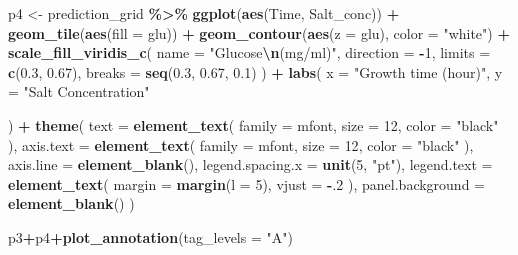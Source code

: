 \documentclass[
  12pt,
]{article}
\newenvironment{Shaded}{\begin{snugshade}}{\end{snugshade}}
\newcommand{\AttributeTok}[1]{\textcolor[rgb]{0.13,0.29,0.53}{#1}}
\newcommand{\DecValTok}[1]{\textcolor[rgb]{0.00,0.00,0.81}{#1}}
\newcommand{\FloatTok}[1]{\textcolor[rgb]{0.00,0.00,0.81}{#1}}
\newcommand{\FunctionTok}[1]{\textcolor[rgb]{0.13,0.29,0.53}{\textbf{#1}}}
\newcommand{\NormalTok}[1]{#1}
\newcommand{\OtherTok}[1]{\textcolor[rgb]{0.56,0.35,0.01}{#1}}
\newcommand{\SpecialCharTok}[1]{\textcolor[rgb]{0.81,0.36,0.00}{\textbf{#1}}}
\newcommand{\StringTok}[1]{\textcolor[rgb]{0.31,0.60,0.02}{#1}}
\begin{document}
\begin{Shaded}
\begin{Highlighting}[]
\NormalTok{p4 }\OtherTok{\textless{}{-}}\NormalTok{ prediction\_grid }\SpecialCharTok{\%\textgreater{}\%}
  \FunctionTok{ggplot}\NormalTok{(}\FunctionTok{aes}\NormalTok{(Time, Salt\_conc)) }\SpecialCharTok{+}
  \FunctionTok{geom\_tile}\NormalTok{(}\FunctionTok{aes}\NormalTok{(}\AttributeTok{fill =}\NormalTok{ glu)) }\SpecialCharTok{+}
  \FunctionTok{geom\_contour}\NormalTok{(}\FunctionTok{aes}\NormalTok{(}\AttributeTok{z =}\NormalTok{ glu), }\AttributeTok{color =} \StringTok{"white"}\NormalTok{) }\SpecialCharTok{+}
  \FunctionTok{scale\_fill\_viridis\_c}\NormalTok{(}
    \AttributeTok{name =} \StringTok{"Glucose}\SpecialCharTok{\textbackslash{}n}\StringTok{(mg/ml)"}\NormalTok{, }\AttributeTok{direction =} \SpecialCharTok{{-}}\DecValTok{1}\NormalTok{,}
    \AttributeTok{limits =} \FunctionTok{c}\NormalTok{(}\FloatTok{0.3}\NormalTok{, }\FloatTok{0.67}\NormalTok{),}
    \AttributeTok{breaks =} \FunctionTok{seq}\NormalTok{(}\FloatTok{0.3}\NormalTok{, }\FloatTok{0.67}\NormalTok{, }\FloatTok{0.1}\NormalTok{)}
\NormalTok{  ) }\SpecialCharTok{+}
  \FunctionTok{labs}\NormalTok{(}
    \AttributeTok{x =} \StringTok{"Growth time (hour)"}\NormalTok{,}
    \AttributeTok{y =} \StringTok{"Salt Concentration"}
    
\NormalTok{  ) }\SpecialCharTok{+}
  \FunctionTok{theme}\NormalTok{(}
    \AttributeTok{text =} \FunctionTok{element\_text}\NormalTok{(}
      \AttributeTok{family =}\NormalTok{ mfont,}
      \AttributeTok{size =} \DecValTok{12}\NormalTok{,}
      \AttributeTok{color =} \StringTok{"black"}
\NormalTok{    ),}
    \AttributeTok{axis.text =} \FunctionTok{element\_text}\NormalTok{(}
      \AttributeTok{family =}\NormalTok{ mfont,}
      \AttributeTok{size =} \DecValTok{12}\NormalTok{,}
      \AttributeTok{color =} \StringTok{"black"}
\NormalTok{    ),}
    \AttributeTok{axis.line =} \FunctionTok{element\_blank}\NormalTok{(),}
    \AttributeTok{legend.spacing.x =} \FunctionTok{unit}\NormalTok{(}\DecValTok{5}\NormalTok{, }\StringTok{"pt"}\NormalTok{),}
    \AttributeTok{legend.text =} \FunctionTok{element\_text}\NormalTok{(}
      \AttributeTok{margin =} \FunctionTok{margin}\NormalTok{(}\AttributeTok{l =} \DecValTok{5}\NormalTok{),}
      \AttributeTok{vjust =} \SpecialCharTok{{-}}\NormalTok{.}\DecValTok{2}
\NormalTok{    ),}
    \AttributeTok{panel.background =} \FunctionTok{element\_blank}\NormalTok{()}
\NormalTok{  )}

\NormalTok{p3}\SpecialCharTok{+}\NormalTok{p4}\SpecialCharTok{+}\FunctionTok{plot\_annotation}\NormalTok{(}\AttributeTok{tag\_levels =} \StringTok{"A"}\NormalTok{)}
\end{Highlighting}
\end{Shaded}
\end{document}
